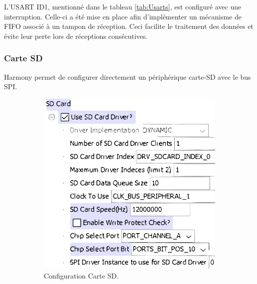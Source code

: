 L'USART ID1, mentionné dans le tableau \ref{tab:Usarts}, est configuré avec une interruption. Celle-ci a été mise en place afin d'implémenter un mécanisme de FIFO associé à un tampon de réception. Ceci facilite le traitement des données et évite leur perte lors de réceptions consécutives.

\subsubsection{Carte SD}
Harmony permet de configurer directement un périphérique carte-SD avec le bus SPI.
\begin{figure}[!h]
	\centering
	\begin{subfigure}[b]{0.5\textwidth}
		\centering
		\includegraphics[width=\linewidth]{../figures/code/harmony/SD-card}
		\caption{Configuration Carte SD.}
		\label{fig:sd-card}
	\end{subfigure}
	\hfill
	\begin{subfigure}[b]{0.44\textwidth}
		\centering

\end{subfigure}
\end{figure}
